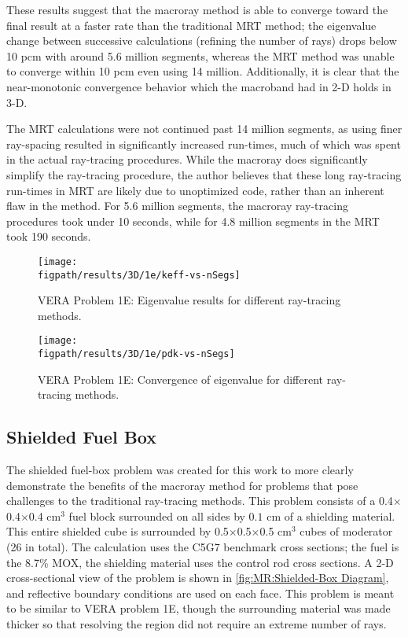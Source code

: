 {{{{        These results suggest that the macroray method is able to converge toward the final result at a faster rate than the traditional \ac{MRT} method;
          the eigenvalue change between successive calculations (refining the number of rays) drops below 10 pcm with around 5.6 million segments, whereas the \ac{MRT} method was unable to converge within 10 pcm even using 14 million.
        Additionally, it is clear that the near-monotonic convergence behavior which the macroband had in 2-D holds in 3-D.

        The \ac{MRT} calculations were not continued past 14 million segments, as using finer ray-spacing resulted in significantly increased run-times, much of which was spent in the actual ray-tracing procedures.
        While the macroray does significantly simplify the ray-tracing procedure, the author believes that these long ray-tracing run-times in \ac{MRT} are likely due to unoptimized code, rather than an inherent flaw in the method.
        For 5.6 million segments, the macroray ray-tracing procedures took under 10 seconds, while for 4.8 million segments in the \ac{MRT} took 190 seconds.

        \begin{figure}[htbp]
          \centering
          \texttt{[image: \\figpath/results/3D/1e/keff-vs-nSegs]}
          \caption{VERA Problem 1E: Eigenvalue results for different ray-tracing methods. \label{fig:MR:1e:3D:keff-vs-nSegs}}
        \end{figure}
        \begin{figure}[htbp]
          \centering
          \texttt{[image: \\figpath/results/3D/1e/pdk-vs-nSegs]}
          \caption{VERA Problem 1E: Convergence of eigenvalue for different ray-tracing methods. \label{fig:MR:1e:3D:pdf-vs-nSegs}}
        \end{figure}
      }
    }

    \subsection{Shielded Fuel Box}{\label{ssec:MR:Shielded Fuel Box}
      The shielded fuel-box problem was created for this work to more clearly demonstrate the benefits of the macroray method for problems that pose challenges to the traditional ray-tracing methods.
      This problem consists of a 0.4$\times$0.4$\times$0.4 cm$^3$ fuel block surrounded on all sides by $0.1$ cm of a shielding material.
      This entire shielded cube is surrounded by 0.5$\times$0.5$\times$0.5 cm$^3$ cubes of moderator (26 in total).
      The calculation uses the C5G7 benchmark cross sections; the fuel is the 8.7\% \ac{MOX}, the shielding material uses the control rod cross sections.
      A 2-D cross-sectional view of the problem is shown in \cref{fig:MR:Shielded-Box Diagram}, and reflective boundary conditions are used on each face.
      This problem is meant to be similar to \ac{VERA} problem 1E, though the surrounding material was made thicker so that resolving the region did not require an extreme number of rays.

}}}
